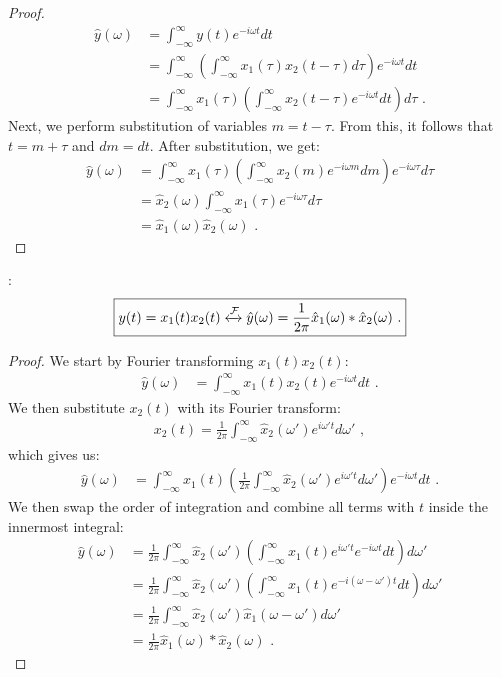\begin{proof}
\begin{align}
\hat{y}(\omega) &= \int_{-\infty}^{\infty} y(t) e^{-i\omega t} dt \\
                 &= \int_{-\infty}^{\infty} \left( \int_{-\infty}^{\infty} x_1(\tau) x_2(t-\tau) d\tau \right) e^{-i\omega t} dt \\
                 &= \int_{-\infty}^{\infty}   x_1(\tau) \left( \int_{-\infty}^{\infty} x_2(t-\tau) e^{-i\omega t} dt \right) d\tau \,\,.
\end{align}
Next, we perform substitution of variables $m=t-\tau$. From this, it follows that $t=m+\tau$ and $dm=dt$. After substitution, we get:
\begin{align}
\hat{y}(\omega)&= \int_{-\infty}^{\infty}   x_1(\tau) \left( \int_{-\infty}^{\infty} x_2(m) e^{-i\omega m} dm \right) e^{-i\omega \tau} d\tau  \\
                &= \hat{x}_2(\omega) \int_{-\infty}^{\infty}   x_1(\tau)  e^{-i\omega \tau} d\tau  \\
                &= \hat{x}_1(\omega)\hat{x}_2(\omega)\,\,.
\end{align}
\end{proof}
:
\begin{equation}
\boxed{
y(t) = x_1(t)x_2(t) \xleftrightarrow{\mathcal{F}} \hat{y}(\omega) = \frac{1}{2\pi}\hat{x}_1(\omega) * \hat{x}_2(\omega)\,\,.
}
\end{equation}
\begin{proof}
We start by Fourier transforming $x_1(t)x_2(t)$:
\begin{align}
\hat{y}(\omega) &= \int_{-\infty}^{\infty} x_1(t) x_2(t) e^{-i\omega t} dt \,\,.
\end{align}
We then substitute $x_2(t)$ with its Fourier transform:
\begin{align}
x_2(t) = \frac{1}{2\pi}\int_{-\infty}^{\infty} \hat{x}_2(\omega') e^{i\omega' t}d\omega'\,\,,
\end{align}
which gives us:
\begin{align}
\hat{y}(\omega) &= \int_{-\infty}^{\infty} x_1(t) \left(\frac{1}{2\pi}\int_{-\infty}^{\infty} \hat{x}_2(\omega') e^{i\omega' t} d\omega' \right) e^{-i\omega t} dt\,\,.
\end{align}
We then swap the order of integration and combine all terms with $t$ inside the innermost integral:
\begin{align}
\hat{y}(\omega)   &= \frac{1}{2\pi} \int_{-\infty}^{\infty} \hat{x}_2(\omega')  \left(\int_{-\infty}^{\infty}  x_1(t) e^{i\omega' t} e^{-i\omega t} dt  \right) d\omega'  \\
    &= \frac{1}{2\pi} \int_{-\infty}^{\infty} \hat{x}_2(\omega')  \left(\int_{-\infty}^{\infty}  x_1(t) e^{-{i(\omega-\omega')t}} dt  \right) d\omega'  \\
    &= \frac{1}{2\pi} \int_{-\infty}^{\infty} \hat{x}_2(\omega')  \hat{x}_1\left(\omega-\omega'\right) d\omega'  \\
    &= \frac{1}{2\pi}\hat{x}_1(\omega )  *\hat{x}_2(\omega)\,\,.
\end{align}
\end{proof}
